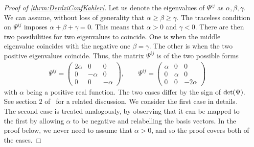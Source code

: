 \documentclass[10pt]{report}
\theoremstyle{definition}
\begin{document}
\begin{proof}[Proof of \cref{thrm:DerdziConfKahler}]
    Let us denote the eigenvalues of $\Psi^{ij}$ as $\alpha,\beta,\gamma$. We can assume, without loss of generality that $\alpha \geq \beta \geq \gamma$. 
    The traceless condition on $\Psi^{ij}$ imposes $\alpha + \beta + \gamma = 0$.
    This means that $\alpha > 0$ and $\gamma < 0$.
    There are then two possibilities for two eigenvalues to coincide. One is when the middle eigenvalue coincides with the negative one $\beta = \gamma$. The other is when the two positive eigenvalues coincide. Thus, the matrix $\Psi^{ij}$ is of the two possible forms
    \begin{align}
        \Psi^{ij} = \begin{pmatrix}
            2\alpha & 0 & 0 \\
            0 & -\alpha & 0 \\
            0 & 0 & -\alpha
        \end{pmatrix} \label{eq:TypeD_Weyl_Curvature_Matrix}, \qquad 
         \Psi^{ij} = \begin{pmatrix}
            \alpha & 0 & 0 \\
            0 & \alpha & 0 \\
            0 & 0 & -2\alpha
        \end{pmatrix}
    \end{align}
    with $\alpha$ being a positive real function. The two cases differ by the sign of ${\rm det}(\Psi)$. See section 2 of~\cite{Gravitational_I_Biquar_2023} for a related discussion. We consider the first case in details. The second case is treated analogously, by observing that it can be mapped to the first by allowing $\alpha$ to be negative and relabelling the basis vectors. In the proof below, we never need to assume that $\alpha>0$, and so the proof covers both of the cases. 
    

\end{proof}
\end{document}
